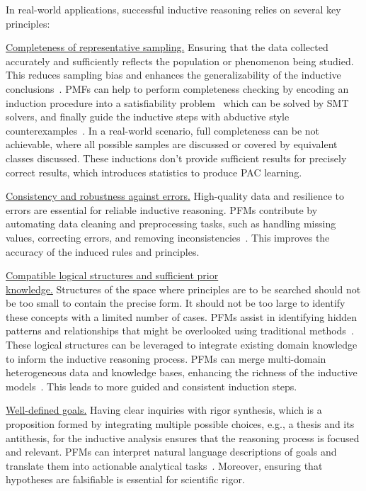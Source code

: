 In real-world applications, successful inductive reasoning relies on several key principles:

\underline{Completeness of representative sampling.} Ensuring that the data collected accurately and sufficiently reflects the population or phenomenon being studied. This reduces sampling bias and enhances the generalizability of the inductive conclusions~\cite{037little2019statistical}. PMFs can help to perform completeness checking by encoding an induction procedure into a satisfiability problem~\cite{ye2024satlm} which can be solved by SMT solvers, and finally guide the inductive steps with abductive style counterexamples~\cite{jha2023counterexample}. In a real-world scenario, full completeness can be not achievable, where all possible samples are discussed or covered by equivalent classes discussed. These inductions don't provide sufficient results for precisely correct results, which introduces statistics to produce PAC learning.
    
\underline{Consistency and robustness against errors.} High-quality data and resilience to errors are essential for reliable inductive reasoning. PFMs contribute by automating data cleaning and preprocessing tasks, such as handling missing values, correcting errors, and removing inconsistencies~\cite{ni2024iterclean, qi2024cleanagent}. This improves the accuracy of the induced rules and principles.
    
\underline{Compatible logical structures and sufficient prior} \\ \underline{knowledge.} Structures of the space where principles are to be searched should not be too small to contain the precise form. It should not be too large to identify these concepts with a limited number of cases. PFMs assist in identifying hidden patterns and relationships that might be overlooked using traditional methods~\cite{ma2023insightpilot, Dibia2023LIDAAT}. These logical structures can be leveraged to integrate existing domain knowledge to inform the inductive reasoning process. PFMs can merge multi-domain heterogeneous data and knowledge bases, enhancing the richness of the inductive models~\cite{Ellis2020DreamCoderGG, Tang2024WorldCoderAM}. This leads to more guided and consistent induction steps.
    
\underline{Well-defined goals.} Having clear inquiries with rigor synthesis, which is a proposition formed by integrating multiple possible choices, e.g., a thesis and its antithesis, for the inductive analysis ensures that the reasoning process is focused and relevant. PFMs can interpret natural language descriptions of goals and translate them into actionable analytical tasks~\cite{li2023resdsql, gu2023few}. Moreover, ensuring that hypotheses are falsifiable is essential for scientific rigor.

